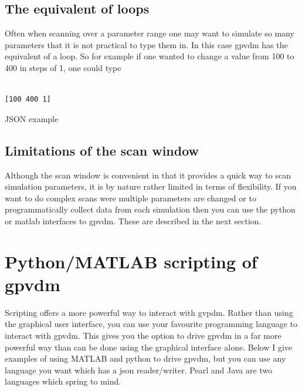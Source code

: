 \subsection{The equivalent of loops}
Often when scanning over a parameter range one may want to simulate so many parameters that it is not practical to type them in.  In this case gpvdm has the equivalent of a loop. So for example if one wanted to change a value from 100 to 400 in steps of 1, one could type

\begin{listing}[H]
\begin{verbatim}

[100 400 1]

\end{verbatim}
\caption{JSON example} 
\label{json-example}
\end{listing}

\subsection{Limitations of the scan window}
Although the scan window is convenient in that it provides a quick way to scan simulation parameters, it is by nature rather limited in terms of flexibility. If you want to do complex scans were multiple parameters are changed or to programmatically collect data from each simulation then you can use the python or matlab interfaces to gpvdm.  These are described in the next section.

\section{Python/MATLAB scripting of gpvdm}
Scripting offers a more powerful way to interact with gvpdm. Rather than using the graphical user interface, you can use your favourite programming language to interact with gpvdm.  This gives you the option to drive gpvdm in a far more powerful way than can be done using the graphical interface alone.  Below I give examples of using MATLAB and python to drive gpvdm, but you can use any language you want which has a json reader/writer.  Pearl and Java are two languages which spring to mind.

